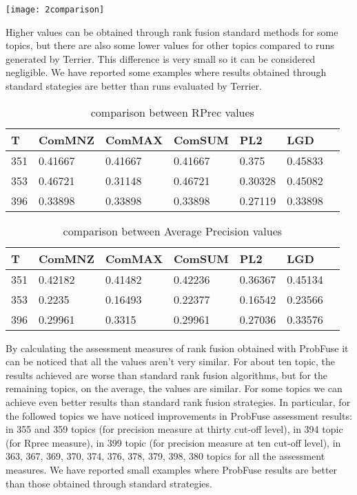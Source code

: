 \documentclass[12pt,journal]{IEEEtran}
\begin{document}
\begin{wrapfigure}
\centering
\texttt{[image: 2comparison]}
\end{wrapfigure}

Higher values can be obtained through rank fusion standard methods for some topics, but there are also some lower values for other topics compared to runs generated by Terrier. This difference is very small so it can be considered negligible. We have reported some examples where results obtained through standard stategies are better than runs evaluated by Terrier. \\
\begin{table}[h!]
\centering
\caption{comparison between RPrec values}
\begin{tabular}{|l|l|l|l|l|l|l|}
\hline
T   & ComMNZ  & ComMAX  & ComSUM  & PL2  & LGD \\ \hline
351 & 0.41667 & 0.41667 & 0.41667 & 0.375   & 0.45833 \\ \hline
353 & 0.46721 & 0.31148 & 0.46721 & 0.30328 & 0.45082 \\ \hline
396 & 0.33898 & 0.33898 & 0.33898 & 0.27119 & 0.33898 \\ \hline 
\end{tabular}
\end{table}

\begin{table}[h!]
\centering
\caption{comparison between Average Precision values}
\begin{tabular}{|l|l|l|l|l|l|l|}
\hline
T   & ComMNZ  & ComMAX  & ComSUM  & PL2  & LGD  \\ \hline
351 & 0.42182 & 0.41482 & 0.42236 & 0.36367 & 0.45134 \\ \hline
353 & 0.2235  & 0.16493 & 0.22377 & 0.16542 & 0.23566 \\ \hline
396 & 0.29961 & 0.3315  & 0.29961 & 0.27036 & 0.33576 \\ \hline
\end{tabular}
\end{table} 

By calculating the assessment measures of rank fusion obtained with ProbFuse it can be noticed that all the values aren’t very similar. For about ten topic, the results achieved are worse than standard rank fusion algorithms, but for the remaining topics, on the average, the values are similar. For some topics we can achieve even better results than standard rank fusion strategies.
In particular, for the followed topics we have noticed improvements in ProbFuse assessment results: in 355 and 359 topics (for precision measure at thirty cut-off level), in 394 topic (for Rprec measure), in 399 topic (for precision measure at ten cut-off level), in 363, 367, 369, 370, 374, 376, 378, 379, 398, 380 topics for all the assessment measures. We have reported small examples where ProbFuse results are better than those obtained through standard strategies. \\
\end{document}
